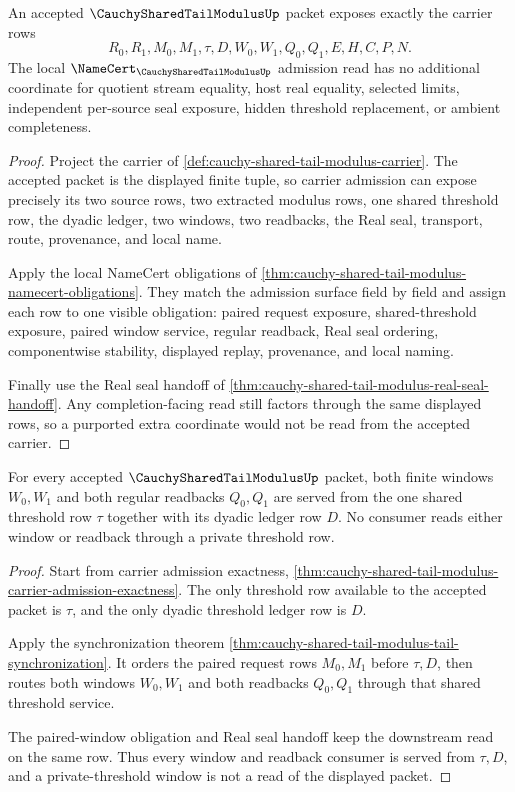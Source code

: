 \begin{theorem}
\label{thm:cauchy-shared-tail-modulus-carrier-admission-exactness}
An accepted $\CauchySharedTailModulusUp$ packet exposes exactly the carrier rows
$$
R_0,R_1,M_0,M_1,\tau,D,W_0,W_1,Q_0,Q_1,E,H,C,P,N.
$$
The local $\NameCert_{\CauchySharedTailModulusUp}$ admission read has no additional coordinate for quotient stream equality, host real equality, selected limits, independent per-source seal exposure, hidden threshold replacement, or ambient completeness.
\end{theorem}
\begin{proof}
Project the carrier of \autoref{def:cauchy-shared-tail-modulus-carrier}. The accepted packet is the displayed finite tuple, so carrier admission can expose precisely its two source rows, two extracted modulus rows, one shared threshold row, the dyadic ledger, two windows, two readbacks, the Real seal, transport, route, provenance, and local name.

Apply the local NameCert obligations of \autoref{thm:cauchy-shared-tail-modulus-namecert-obligations}. They match the admission surface field by field and assign each row to one visible obligation: paired request exposure, shared-threshold exposure, paired window service, regular readback, Real seal ordering, componentwise stability, displayed replay, provenance, and local naming.

Finally use the Real seal handoff of \autoref{thm:cauchy-shared-tail-modulus-real-seal-handoff}. Any completion-facing read still factors through the same displayed rows, so a purported extra coordinate would not be read from the accepted carrier.
\end{proof}

\begin{theorem}
\label{thm:cauchy-shared-tail-modulus-paired-window-readback-service}
For every accepted $\CauchySharedTailModulusUp$ packet, both finite windows $W_0,W_1$ and both regular readbacks $Q_0,Q_1$ are served from the one shared threshold row $\tau$ together with its dyadic ledger row $D$. No consumer reads either window or readback through a private threshold row.
\end{theorem}
\begin{proof}
Start from carrier admission exactness, \autoref{thm:cauchy-shared-tail-modulus-carrier-admission-exactness}. The only threshold row available to the accepted packet is $\tau$, and the only dyadic threshold ledger row is $D$.

Apply the synchronization theorem \autoref{thm:cauchy-shared-tail-modulus-tail-synchronization}. It orders the paired request rows $M_0,M_1$ before $\tau,D$, then routes both windows $W_0,W_1$ and both readbacks $Q_0,Q_1$ through that shared threshold service.

The paired-window obligation and Real seal handoff keep the downstream read on the same row. Thus every window and readback consumer is served from $\tau,D$, and a private-threshold window is not a read of the displayed packet.
\end{proof}

